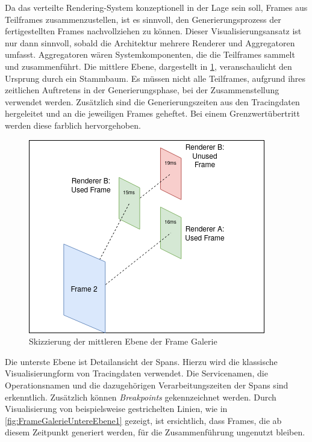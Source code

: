 Da das verteilte Rendering-System konzeptionell in der Lage sein soll, Frames aus Teilframes zusammenzustellen, ist es sinnvoll, den Generierungsprozess der fertigestellten Frames nachvollziehen zu können. Dieser Visualisierungsansatz ist nur dann sinnvoll, sobald die Architektur mehrere Renderer und Aggregatoren umfasst. Aggregatoren wären Systemkomponenten, die die Teilframes sammelt und zusammenführt. Die mittlere Ebene, dargestellt in \cref{fig:FrameGalerieMittlereEbene},  veranschaulicht den Ursprung durch ein Stammbaum. Es müssen nicht alle Teilframes, aufgrund ihres zeitlichen Auftretens in der Generierungsphase, bei der Zusammenstellung verwendet werden. Zusätzlich sind die Generierungszeiten aus den Tracingdaten hergeleitet und an die jeweiligen Frames geheftet. Bei einem Grenzwertübertritt werden diese farblich hervorgehoben.

\begin{figure}[!ht]
	\centering
	\includegraphics[scale=0.8]{img/Design/FrameGalerieMittlereEbene.png}
	\caption[Mittlere Ebene der Frame Galerie]{ Skizzierung der mittleren Ebene der Frame Galerie}
	\label{fig:FrameGalerieMittlereEbene}
\end{figure}

Die unterste Ebene ist Detailansicht der Spans. Hierzu wird die klassische Visualisierungform von Tracingdaten verwendet. Die Servicenamen, die Operationsnamen und die dazugehörigen Verarbeitungszeiten der Spans sind erkenntlich. Zusätzlich können \emph{Breakpoints} gekennzeichnet werden. Durch Visualisierung von beispielsweise gestrichelten Linien, wie in \cref{fig:FrameGalerieUntereEbene1} gezeigt, ist ersichtlich, dass Frames, die ab diesem Zeitpunkt generiert werden, für die Zusammenführung ungenutzt bleiben.

